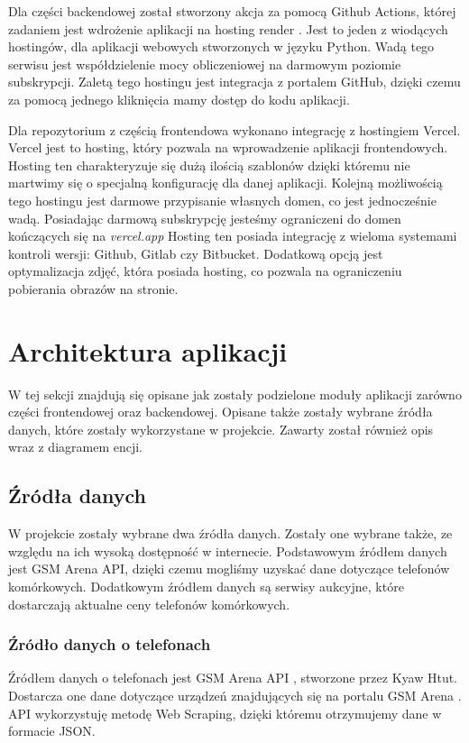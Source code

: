 Dla części backendowej został stworzony akcja za pomocą Github Actions, której zadaniem jest wdrożenie aplikacji na hosting render \cite{render}. Jest to jeden z wiodących hostingów, dla aplikacji webowych stworzonych w języku Python. Wadą tego serwisu jest współdzielenie mocy obliczeniowej na darmowym poziomie subskrypcji. Zaletą tego hostingu jest integracja z portalem GitHub, dzięki czemu za pomocą jednego kliknięcia mamy dostęp do kodu aplikacji.

Dla repozytorium z częścią frontendowa wykonano integrację z hostingiem Vercel. Vercel \cite{vercel} jest to hosting, który pozwala na wprowadzenie aplikacji frontendowych. Hosting ten charakteryzuje się dużą ilością szablonów dzięki któremu nie martwimy się o specjalną konfigurację dla danej aplikacji. Kolejną możliwością tego hostingu jest darmowe przypisanie własnych domen, co jest jednocześnie wadą. Posiadając darmową subskrypcję jesteśmy ograniczeni do domen kończących się na \textit{vercel.app} Hosting ten posiada integrację z wieloma systemami kontroli wersji: Github, Gitlab czy Bitbucket. Dodatkową opcją jest optymalizacja zdjęć, która posiada hosting, co pozwala na ograniczeniu pobierania obrazów na stronie.

\section{Architektura aplikacji}
W tej sekcji znajdują się opisane jak zostały podzielone moduły aplikacji zarówno części frontendowej oraz backendowej. Opisane także zostały wybrane źródła danych, które zostały wykorzystane w projekcie. Zawarty został również opis wraz z diagramem encji.

\subsection{Źródła danych}\label{data_sources}
W projekcie zostały wybrane dwa źródła danych. Zostały one wybrane także, ze względu na ich wysoką dostępność w internecie. Podstawowym źródłem danych jest GSM Arena API, dzięki czemu mogliśmy uzyskać dane dotyczące telefonów komórkowych. Dodatkowym źródłem danych są serwisy aukcyjne, które dostarczają aktualne ceny telefonów komórkowych.

\subsubsection{Źródło danych o telefonach}\label{api}
Źródłem danych o telefonach jest GSM Arena API \cite{gsm_arena_api}, stworzone przez Kyaw Htut. Dostarcza one dane dotyczące urządzeń znajdujących się na portalu GSM Arena \cite{gsm_arena}. API wykorzystuję metodę Web Scraping, dzięki któremu otrzymujemy dane w formacie JSON.

